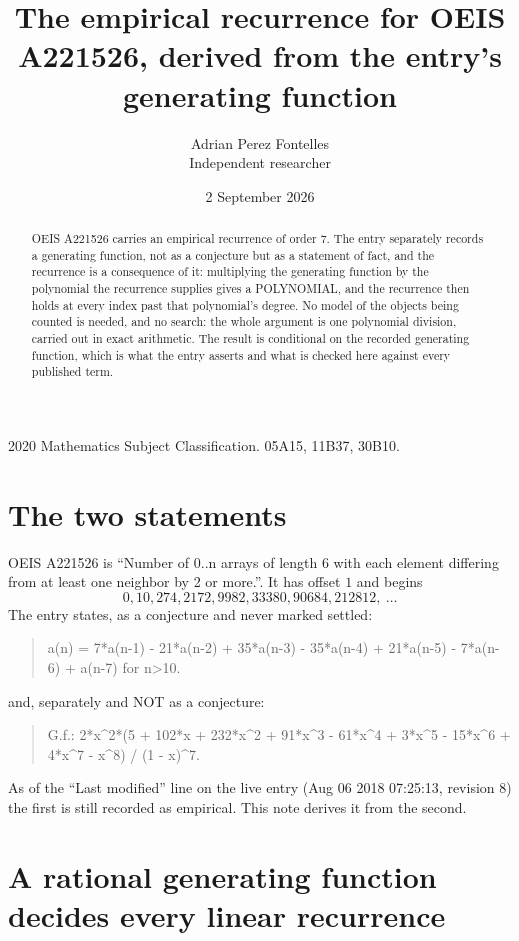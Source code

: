 \documentclass[11pt,a4paper]{article}
\title{The empirical recurrence for OEIS A221526, derived from the entry's generating function}
\author{Adrian Perez Fontelles\\ \small Independent researcher}
\date{2 September 2026}
\theoremstyle{plain}
\theoremstyle{definition}
\begin{document}
\maketitle

\begin{abstract}
OEIS A221526 carries an empirical recurrence of order $7$. The entry separately records a
generating function, not as a conjecture but as a statement of fact, and the recurrence is a
consequence of it: multiplying the generating function by the polynomial the recurrence
supplies gives a POLYNOMIAL, and the recurrence then holds at every index past that
polynomial's degree. No model of the objects being counted is needed, and no search: the
whole argument is one polynomial division, carried out in exact arithmetic. The result is
conditional on the recorded generating function, which is what the entry asserts and what is
checked here against every published term.
\end{abstract}

\noindent\small 2020 Mathematics Subject Classification. 05A15, 11B37, 30B10.\normalsize

\section{The two statements}

OEIS A221526 is ``Number of 0..n arrays of length 6 with each element differing from at least one neighbor by 2 or more.''. It has offset $1$ and begins
\[
0, 10, 274, 2172, 9982, 33380, 90684, 212812,\ \dots
\]
The entry states, as a conjecture and never marked settled:
\begin{quote}
a(n) = 7*a(n-1) - 21*a(n-2) + 35*a(n-3) - 35*a(n-4) + 21*a(n-5) - 7*a(n-6) + a(n-7) for n>10.
\end{quote}
and, separately and NOT as a conjecture:
\begin{quote}
G.f.: 2*x\^{}2*(5 + 102*x + 232*x\^{}2 + 91*x\^{}3 - 61*x\^{}4 + 3*x\^{}5 - 15*x\^{}6 + 4*x\^{}7 - x\^{}8) / (1 - x)\^{}7.
\end{quote}
As of the ``Last modified'' line on the live entry (Aug 06 2018 07:25:13, revision 8) the first is still
recorded as empirical. This note derives it from the second.

\section{A rational generating function decides every linear recurrence}
\end{document}

